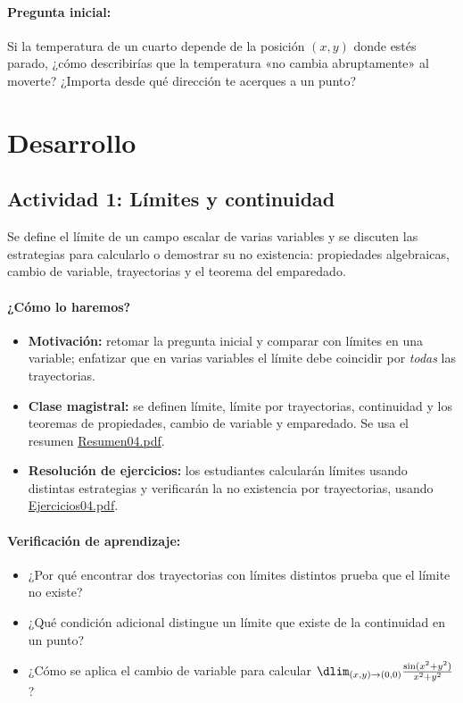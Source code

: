 \documentclass[a4,11pt]{aleph-notas}
\begin{document}
\paragraph{Pregunta inicial:}
Si la temperatura de un cuarto depende de la posición $(x,y)$ donde estés parado, ¿cómo describirías que la temperatura «no cambia abruptamente» al moverte? ¿Importa desde qué dirección te acerques a un punto?

\section*{Desarrollo}

\subsection*{Actividad 1: Límites y continuidad}
Se define el límite de un campo escalar de varias variables y se discuten las estrategias para calcularlo o demostrar su no existencia: propiedades algebraicas, cambio de variable, trayectorias y el teorema del emparedado.

\paragraph{¿Cómo lo haremos?}
\begin{itemize}[leftmargin=*]
    \item \textbf{Motivación:} retomar la pregunta inicial y comparar con límites en una variable; enfatizar que en varias variables el límite debe coincidir por \emph{todas} las trayectorias.
    \item \textbf{Clase magistral:} se definen límite, límite por trayectorias, continuidad y los teoremas de propiedades, cambio de variable y emparedado. Se usa el resumen \href{https://andres-merino.github.io/MatematicaIII-05-N0051/01Resumen/Resumen04.pdf}{Resumen04.pdf}.
    \item \textbf{Resolución de ejercicios:} los estudiantes calcularán límites usando distintas estrategias y verificarán la no existencia por trayectorias, usando \href{https://andres-merino.github.io/MatematicaIII-05-N0051/04Ejercicios/Ejercicios04.pdf}{Ejercicios04.pdf}.
\end{itemize}

\paragraph{Verificación de aprendizaje:}
\begin{itemize}[leftmargin=*]
    \item ¿Por qué encontrar dos trayectorias con límites distintos prueba que el límite no existe?
    \item ¿Qué condición adicional distingue un límite que existe de la continuidad en un punto?
    \item ¿Cómo se aplica el cambio de variable para calcular $\dlim_{(x,y)\to(0,0)}\frac{\sin(x^2+y^2)}{x^2+y^2}$?
\end{itemize}
\end{document}
